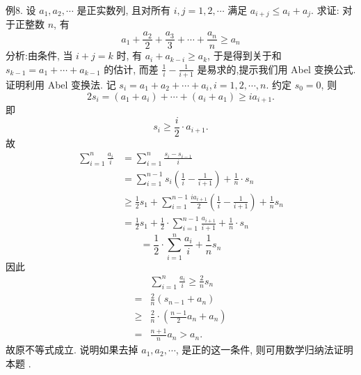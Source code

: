 例8. 设 $a_1, a_2, \cdots$ 是正实数列, 且对所有 $i, j=1,2, \cdots$ 满足 $a_{i+j} \leqslant a_i+a_j$. 求证: 对于正整数 $n$, 有
$$
a_1+\frac{a_2}{2}+\frac{a_3}{3}+\cdots+\frac{a_n}{n} \geqslant a_n
$$
分析:由条件, 当 $i+j=k$ 时, 有 $a_i+a_{k-i} \geqslant a_k$, 于是得到关于和 $s_{k-1}= a_1+\cdots+a_{k-1}$ 的估计, 而差 $\frac{1}{i}-\frac{1}{i+1}$ 是易求的,提示我们用 Abel 变换公式.
证明利用 Abel 变换法.
记 $s_i=a_1+a_2+\cdots+a_i, i=1,2, \cdots, n$.
约定 $s_0=0$, 则
$$
2 s_i=\left(a_1+a_i\right)+\cdots+\left(a_i+a_1\right) \geqslant i a_{i+1} .
$$
即
$$
s_i \geqslant \frac{i}{2} \cdot a_{i+1} .
$$
故
$$
\begin{aligned}
\sum_{i=1}^n \frac{a_i}{i} & =\sum_{i=1}^n \frac{s_i-s_{i-1}}{i} \\
& =\sum_{i=1}^{n-1} s_i\left(\frac{1}{i}-\frac{1}{i+1}\right)+\frac{1}{n} \cdot s_n \\
& \geqslant \frac{1}{2} s_1+\sum_{i=1}^{n-1} \frac{i a_{i+1}}{2}\left(\frac{1}{i}-\frac{1}{i+1}\right)+\frac{1}{n} s_n \\
& =\frac{1}{2} s_1+\frac{1}{2} \cdot \sum_{i=1}^{n-1} \frac{a_{i+1}}{i+1}+\frac{1}{n} \cdot s_n
\end{aligned}
$$
$$
=\frac{1}{2} \cdot \sum_{i=1}^n \frac{a_i}{i}+\frac{1}{n} s_n
$$
因此
$$
\begin{aligned}
& \sum_{i=1}^n \frac{a_i}{i} \geqslant \frac{2}{n} s_n \\
= & \frac{2}{n}\left(s_{n-1}+a_n\right) \\
\geqslant & \frac{2}{n} \cdot\left(\frac{n-1}{2} a_n+a_n\right) \\
= & \frac{n+1}{n} a_n>a_n .
\end{aligned}
$$
故原不等式成立.
说明如果去掉 $a_1, a_2, \cdots$, 是正的这一条件, 则可用数学归纳法证明本题 .



